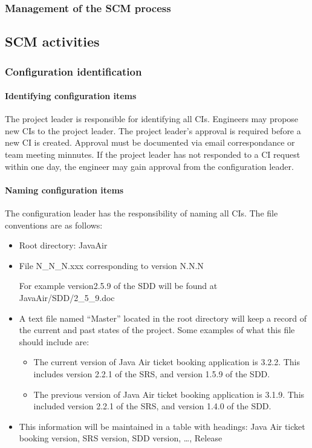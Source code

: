 \documentclass{scrartcl}
\begin{document}
\subsubsection{Management of the SCM process}
\subsection{SCM activities}
\subsubsection{Configuration identification}
\paragraph{Identifying configuration items}
The project leader is responsible for identifying all CIs.  Engineers may propose new CIs to the project leader.  The project leader's approval is required before a new CI is created.  Approval must be documented via email correspondance or team meeting minnutes.  If the project leader has not responded to a CI request within one day, the engineer may gain approval from the configuration leader.
\paragraph{Naming configuration items}
The configuration leader has the responsibility of naming all CIs.  The file conventions are as follows:
\begin{itemize}[label={}, leftmargin=.5in]
\item Root directory: JavaAir

\item File N\_N\_N.xxx corresponding to version N.N.N
\setlength{\parindent}{5ex}
\par For example version2.5.9 of the SDD will be found at JavaAir/SDD/2\_5\_9.doc
\item A text file named ``Master'' located in the root directory will keep a record of the current and past states of the project.  Some examples of what this file should include are:
\begin{itemize}[label={}, leftmargin=.5in]
\item The current version of Java Air ticket booking application is 3.2.2.  This includes version 2.2.1 of the SRS, and version 1.5.9 of the SDD.
\item The previous version of Java Air ticket booking application is 3.1.9.  This included version 2.2.1 of the SRS, and version 1.4.0 of the SDD.
 \end{itemize}
 \item This information will be maintained in a table with headings: Java Air ticket booking version, SRS version, SDD version, \ldots, Release
\end{itemize}
\end{document}
